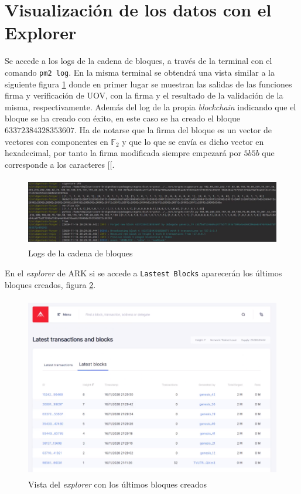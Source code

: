

\newpage

\section{Visualización de los datos con el Explorer}

Se accede a los logs de la cadena de bloques, a través de la terminal con el comando \texttt{pm2 log}. En la misma terminal se obtendrá una vista similar a la siguiente figura \ref{fig:explorer-1} donde en primer lugar se muestran las salidas de las funciones firma y verificación de UOV, con la firma y el resultado de la validación de la misma, respectivamente. Además del log de la propia \textit{blockchain} indicando que el bloque se ha creado con éxito, en este caso se ha creado el bloque $63372384328353607$. Ha de notarse que la firma del bloque es un vector de vectores con componentes en $\mathds{F}_2$ y que lo que se envía es dicho vector en hexadecimal, por tanto la firma modificada siempre empezará por $5b5b$ que corresponde a los caracteres $[[$.

\begin{figure}[H]
	\centering
	\includegraphics[width=12cm,height=3cm]{figuras/explorer_1.png}
	\caption{Logs de la cadena de bloques}
	\label{fig:explorer-1}
\end{figure}

En el \textit{explorer} de ARK si se accede a \texttt{Lastest Blocks} aparecerán los últimos bloques creados, figura \ref{fig:explorer-2}.

\begin{figure}[H]
	\centering
	\includegraphics[width=12.5cm,height=8cm]{figuras/explorer_2.png}
	\caption{Vista del \textit{explorer} con los últimos bloques creados}
	\label{fig:explorer-2}
\end{figure}

